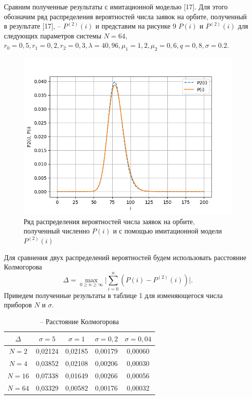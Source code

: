 Сравним полученные результаты с имитационной моделью [17]. Для этого обозначим ряд распределения вероятностей числа заявок на орбите, полученный в результате [17], -- $P^{(2)}(i)$ и представим на рисунке 9 $P(i)$  и $P^{(2)}(i)$ для следующих параметров системы $N=64$, $r_{0}=0,5, r_{1}=0,2, r_{2}=0,3, \lambda=40,96, \mu_{1}=1,2, \mu_{2}=0,6 , q=0,8, \sigma=0.2.$
\begin{figure}[H]
	\centering
	\includegraphics[width=0.6\linewidth]{pic64_0_2.png} 
	\caption{Ряд распределения вероятностей числа заявок на орбите, полученный численно $P(i)$ и с помощью имитационной модели $P^{(2)}(i)$}
	\label{ris:experimcoded}
\end{figure}
Для сравнения двух распределений вероятностей будем использовать расстояние Колмогорова
\begin{equation*}
	\Delta=\max_{0 \geqslant n \geqslant \infty}\bigg|\sum_{i=0}^{n}(P(i)-P^{(2)}(i))\bigg|.
\end{equation*}
Приведем полученные результаты в таблице 1 для изменяющегося числа приборов $N$ и $\sigma$.


\begin{table}[h]
	
	\caption{ -- Расстояние Колмогорова}
	\begin{tabular}{ | c | c | c | c | c | }
		\hline
		$\Delta$ & $\sigma=5$ & $\sigma=1$ & $\sigma=0,2$  & $\sigma=0,04$ \\ \hline
		$N=2$ & 0,02124 & 0,02185 & 0,00179 & 0,00060 \\ \hline
		$N=4$ & 0,03852 & 0,02108 & 0,00206 & 0,00030 \\ \hline
		$N=16$ & 0,07338 & 0,01649 & 0,00266 & 0,00056 \\ \hline
		$N=64$ & 0,03329 & 0,00582 & 0,00176 & 0,00032 \\ 
		\hline
	\end{tabular}
\end{table}
